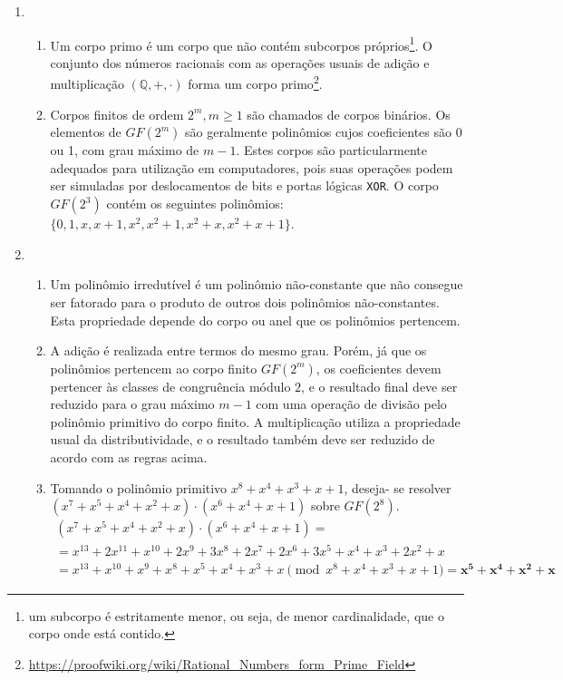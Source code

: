 \documentclass[fleqn]{article}
\begin{document}
\begin{enumerate}[label=\textbf{\arabic*})]
\begin{enumerate}
\end{enumerate}

\item

\begin{enumerate}

\item Um corpo primo é um corpo que não contém subcorpos próprios\footnote{um
subcorpo é estritamente menor, ou seja, de menor cardinalidade, que o corpo
onde está contido.}. O conjunto dos números racionais com as operações usuais
de adição e multiplicação $(\mathbb{Q}, +, \cdot)$ forma um corpo
primo\footnote{\url{
https://proofwiki.org/wiki/Rational_Numbers_form_Prime_Field}}.

\item Corpos finitos de ordem $2^m, m \geq 1$ são chamados de corpos binários.
Os elementos de $GF(2^m)$ são geralmente polinômios cujos coeficientes são 0
ou 1, com grau máximo de $m - 1$. Estes corpos são particularmente adequados
para utilização em computadores, pois suas operações podem ser simuladas por
deslocamentos de bits e portas lógicas \texttt{XOR}. O corpo $GF(2^3)$ contém
os seguintes polinômios:
$\{0, 1, x, x + 1, x^2, x^2 + 1, x^2 + x, x^2 + x + 1\}$.

\end{enumerate}

\item

\begin{enumerate}

\item Um polinômio irredutível é um polinômio não-constante que não consegue
ser fatorado para o produto de outros dois polinômios não-constantes. Esta
propriedade depende do corpo ou anel que os polinômios pertencem.

\item A adição é realizada entre termos do mesmo grau. Porém, já que os
polinômios pertencem ao corpo finito $GF(2^m)$, os coeficientes devem
pertencer às classes de congruência módulo $2$, e o resultado final deve ser
reduzido para o grau máximo $m - 1$ com uma operação de divisão pelo polinômio
primitivo do corpo finito. A multiplicação utiliza a propriedade usual da
distributividade, e o resultado também deve ser reduzido de acordo com as
regras acima.

\item Tomando o polinômio primitivo $x^8 + x^4 + x^3 + x + 1$, deseja- se
resolver $(x^7 + x^5 + x^4 + x^2 + x) \cdot (x^6 + x^4 + x + 1)$ sobre
$GF(2^8)$.
\begin{multline*}
(x^7 + x^5 + x^4 + x^2 + x) \cdot (x^6 + x^4 + x + 1) = \\
= x^{13} + 2x^{11} + x^{10} + 2x^9 + 3x^8 + 2x^7
+ 2x^6 + 3x^5 + x^4 + x^3 + 2x^2 + x \\
= x^{13} + x^{10} + x^9 + x^8 + x^5 + x^4 + x^3 + x
\pmod{x^8 + x^4 + x^3 + x + 1}
= \boldsymbol{x^5 + x^4 + x^2 + x}
\end{multline*}


\end{enumerate}
\end{enumerate}
\end{document}
